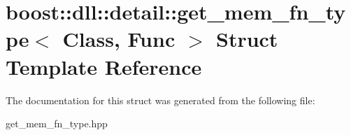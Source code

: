 \hypertarget{a01412}{}\section{boost\+:\+:dll\+:\+:detail\+:\+:get\+\_\+mem\+\_\+fn\+\_\+type$<$ Class, Func $>$ Struct Template Reference}
\label{a01412}


The documentation for this struct was generated from the following file\+:\begin{DoxyCompactItemize}
\item 
get\+\_\+mem\+\_\+fn\+\_\+type.\+hpp\end{DoxyCompactItemize}
